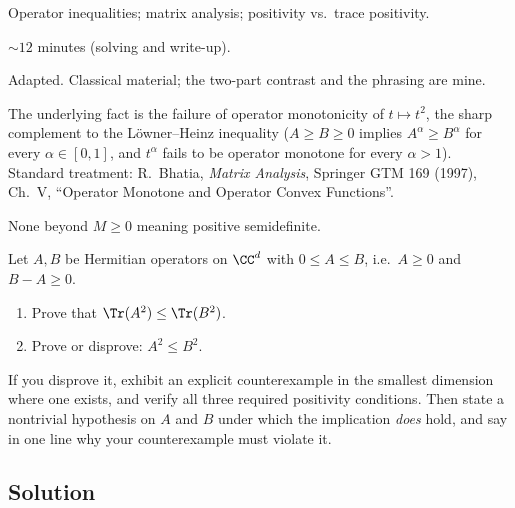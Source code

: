 
\begin{daymeta}
  \item[Topic] Operator inequalities; matrix analysis; positivity vs.\ trace positivity.
  \item[Estimated time] $\sim 12$ minutes (solving and write-up).
  \item[Origin] Adapted. Classical material; the two-part contrast and the phrasing
    are mine.
  \item[Source] The underlying fact is the failure of operator monotonicity of
    $t\mapsto t^{2}$, the sharp complement to the L\"owner--Heinz inequality
    ($A\ge B\ge 0$ implies $A^{\alpha}\ge B^{\alpha}$ for every $\alpha\in[0,1]$, and
    $t^{\alpha}$ fails to be operator monotone for every $\alpha>1$). Standard
    treatment: R.~Bhatia, \emph{Matrix Analysis}, Springer GTM 169 (1997), Ch.~V,
    ``Operator Monotone and Operator Convex Functions''.
  \item[Prerequisites] None beyond $M\ge 0$ meaning positive semidefinite.
\end{daymeta}

\begin{problem}
Let $A,B$ be Hermitian operators on $\CC^{d}$ with $0\le A\le B$, i.e.\ $A\ge 0$ and
$B-A\ge 0$.
\begin{enumerate}[label=\textbf{(\alph*)},leftmargin=*]
  \item Prove that $\Tr(A^{2})\le\Tr(B^{2})$.
  \item Prove or disprove: $A^{2}\le B^{2}$.
\end{enumerate}
If you disprove it, exhibit an explicit counterexample in the smallest dimension where
one exists, and verify all three required positivity conditions. Then state a nontrivial
hypothesis on $A$ and $B$ under which the implication \emph{does} hold, and say in one
line why your counterexample must violate it.
\end{problem}

\subsection*{Solution}

\begin{solution}[Part (a)]
\end{solution}

\begin{solution}[Part (b)]
\end{solution}

